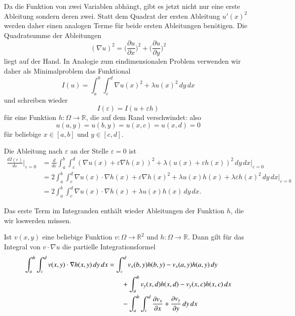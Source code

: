 Da die Funktion von zwei Variablen abhängt, gibt es jetzt nicht nur
eine erste Ableitung sondern deren zwei.
Statt dem Quadrat der ersten Ableitung $u'(x)^2$ werden daher
einen analogen Terme für beide ersten Ableitungen benötigen.
Die Quadratsumme der Ableitungen
\[
(\nabla u)^2
=
\biggl(\frac{\partial u}{\partial x}\biggr)^2
+
\biggl(\frac{\partial u}{\partial y}\biggr)^2
\]
liegt auf der Hand.
In Analogie zum eindimensionalen Problem verwenden wir daher
als Minimalproblem das Funktional
\[
I(u)
=
\int_a^b\int_c^d \nabla u(x)^2 + \lambda u(x)^2\,dy \,dx
\]
und schreiben wieder
\[
I(\varepsilon)
=
I(u + \varepsilon h)
\]
für eine Funktion $h\colon \Omega\to\mathbb R$, die auf dem Rand
verschwindet: also
\[
u(a,y) = u(b,y) = u(x,c) = u(x,d) = 0
\]
für beliebige $x\in[a,b]$ und $y\in[c,d]$.

Die Ableitung nach $\varepsilon$ an der Stelle $\varepsilon=0$ ist
\begin{align*}
\frac{dI(\varepsilon)}{d\varepsilon}\bigg|_{\varepsilon=0}
&=
\frac{d}{d\varepsilon}
\int_a^b\int_c^d
(\nabla u(x)+\varepsilon \nabla h(x))^2
+
\lambda (u(x) + \varepsilon h(x))^2
\,dy \,dx
\bigg|_{\varepsilon=0}
\\
&=
2
\int_a^b\int_c^d
\nabla u(x)\cdot \nabla h(x) +\varepsilon \nabla h(x)^2
+
\lambda u(x) h(x) + \lambda \varepsilon h(x)^2
\,dy \,dx
\bigg|_{\varepsilon=0}
\\
&=
2
\int_a^b\int_c^d
\nabla u(x)\cdot \nabla h(x) + \lambda u(x) h(x)
\,dy \,dx.
\end{align*}

Das erste Term im Integranden enthält wieder Ableitungen der Funktion
$h$, die wir loswerden müssen.

\begin{lemma}
\label{pde:lemma:partint2}
Ist $v(x,y)$ eine beliebige Funktion $v\colon\Omega\to\mathbb R^2$ und
$h\colon\Omega\to\mathbb R$. 
Dann gilt für das Integral von $v\cdot\nabla u$ die partielle
Integrationsformel
\begin{align}
\int_a^b\int_c^d v(x,y)\cdot \nabla h(x,y)\,dy\,dx
&=
\int_c^d
v_x(b,y) h(b,y)
-
v_x(a,y) h(a,y)
\,dy
\notag
\\
&\qquad
+
\int_a^b
v_y(x,d) h(x,d)
-
v_y(x,c) h(x,c)
\,dx
\notag
\\
&\qquad
-\int_a^b\int_c^d
\frac{\partial v_x}{\partial x}+\frac{\partial v_y}{\partial y}
\,dy\,dx
\label{pde:fem:part2d}
\end{align}
\end{lemma}

